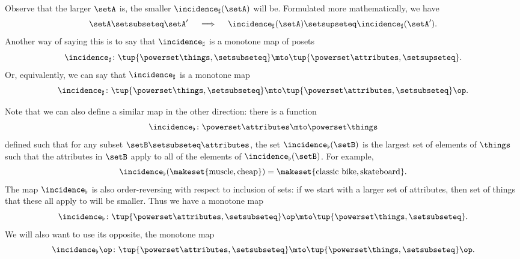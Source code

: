Observe that the larger $\setA$ is, the smaller $\incidence_\sharp(\setA)$ will be.
Formulated more mathematically, we have
\begin{equation}\label{eq:fca-example-pushforward-7}
    \setA \setsubseteq \setA' \quad \implies \quad \incidence_\sharp(\setA) \setsupseteq \incidence_\sharp(\setA').
\end{equation}
Another way of saying this is to say that $\incidence_\sharp$ is a monotone map of posets
\begin{equation}\label{eq:fca-example-pushforward-8}
    \incidence_\sharp \colon \tup{\powerset \things, \setsubseteq} \mto \tup{\powerset \attributes, \setsupseteq}.
\end{equation}
Or, equivalently, we can say that $\incidence_\sharp$ is a monotone map
\begin{equation}\label{eq:fca-example-pushforward-9}
    \incidence_\sharp \colon \tup{\powerset \things, \setsubseteq} \mto \tup{\powerset \attributes, \setsubseteq}\op.
\end{equation}

Note that we can also define a similar map in the other direction: there is a function
\begin{equation}\label{eq:fca-example-pullback-1}
    \incidence_\flat \colon \powerset \attributes \mto \powerset \things
\end{equation}
defined such that for any subset $\setB \setsubseteq \attributes$, the set $\incidence_\flat(\setB)$ is the largest set of elements of $\things$ such that the attributes in $\setB$ apply to all of the elements of $\incidence_\flat(\setB)$.
For example,
\begin{equation}\label{eq:fca-example-pullback-2}
    \incidence_\flat(\makeset{\text{muscle}, \text{cheap}}) = \makeset{\text{classic bike}, \text{skateboard}}.
\end{equation}
The map $\incidence_\flat$ is also order-reversing with respect to inclusion of sets: if we start with a larger set of attributes, then set of things that these all apply to will be smaller.
Thus we have a monotone map
\begin{equation}\label{eq:fca-example-pullback-3}
    \incidence_\flat \colon \tup{\powerset \attributes, \setsubseteq}\op \mto \tup{\powerset \things, \setsubseteq}.
\end{equation}
We will also want to use its opposite, the monotone map
\begin{equation}\label{eq:fca-example-pullback-4}
    \incidence_\flat\op \colon \tup{\powerset \attributes, \setsubseteq} \mto \tup{\powerset \things, \setsubseteq}\op.
\end{equation}

